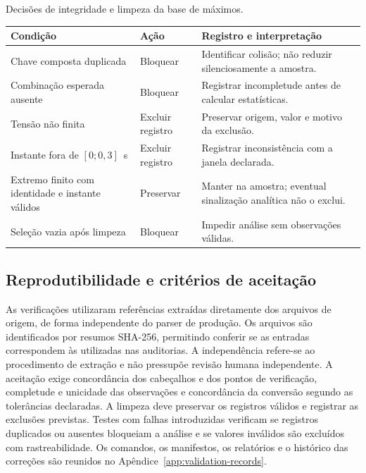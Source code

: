 \documentclass[
	12pt,				%
	openright,			%
	oneside,			%
	a4paper,			%
	chapter=TITLE,		%
	section=TITLE,		%
	subsection=TITLE,	%
	subsubsection=TITLE,%
	english,			%
	brazilian			%
	]{abntex2}
\theoremstyle{definition}
\begin{document}
\begin{quadro}[htbp]
\centering
\caption{Decisões de integridade e limpeza da base de máximos.}
\label{qua:regras-limpeza}
\small
\renewcommand{\arraystretch}{1.15}
\begin{tabularx}{\textwidth}{|L|
    >{\RaggedRight\arraybackslash}p{2cm}|L|}
\hline
\textbf{Condição} & \textbf{Ação} & \textbf{Registro e interpretação} \\
\hline
Chave composta duplicada & Bloquear &
Identificar colisão; não reduzir silenciosamente a amostra. \\
\hline
Combinação esperada ausente & Bloquear &
Registrar incompletude antes de calcular estatísticas. \\
\hline
Tensão não finita & Excluir registro &
Preservar origem, valor e motivo da exclusão. \\
\hline
Instante fora de $[0;0{,}3]$~s & Excluir registro &
Registrar inconsistência com a janela declarada. \\
\hline
Extremo finito com identidade e instante válidos & Preservar &
Manter na amostra; eventual sinalização analítica não o exclui. \\
\hline
Seleção vazia após limpeza & Bloquear &
Impedir análise sem observações válidas. \\
\hline
\end{tabularx}
\end{quadro}
\FloatBarrier

\subsection{Reprodutibilidade e critérios de aceitação}

As verificações utilizaram referências extraídas diretamente dos arquivos de
origem, de forma independente do parser de produção. Os arquivos são
identificados por resumos SHA-256, permitindo conferir se as entradas
correspondem às utilizadas nas auditorias. A independência refere-se ao
procedimento de extração e não pressupõe revisão humana independente.
A aceitação exige concordância dos cabeçalhos e dos pontos de verificação,
completude e unicidade das observações e concordância da conversão segundo
as tolerâncias declaradas. A limpeza deve preservar os registros válidos e
registrar as exclusões previstas. Testes com falhas introduzidas verificam
se registros duplicados ou ausentes bloqueiam a análise e se valores
inválidos são excluídos com rastreabilidade. Os comandos, os manifestos, os relatórios e o histórico das correções são
reunidos no Apêndice~\ref{app:validation-records}.
\end{document}
